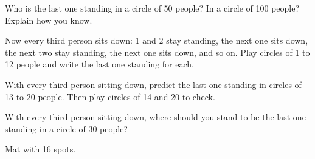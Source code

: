 \documentclass[12pt]{article}
\begin{document}
\newpage
{} Who is the last one standing in a circle of 50 people? In a circle of 100 people? Explain how you know.

\noindent{}

\vspace{0.5cm}
 Now every third person sits down: 1 and 2 stay standing, the next one sits down, the next two stay standing, the next one sits down, and so on. Play circles of 1 to 12 people and write the last one standing for each.

\noindent{}

\vspace{0.3cm}
\noindent{}

\newpage
{} With every third person sitting down, predict the last one standing in circles of 13 to 20 people. Then play circles of 14 and 20 to check.

\noindent{}

\vspace{0.5cm}
 With every third person sitting down, where should you stand to be the last one standing in a circle of 30 people?

\noindent{}

\newpage
\noindent Mat with 16 spots.\par
\vspace*{\fill}
\begin{center}
\matsixteen
\end{center}
\vspace*{\fill}

\newpage
\noindent

\newpage
\noindent
\end{document}
